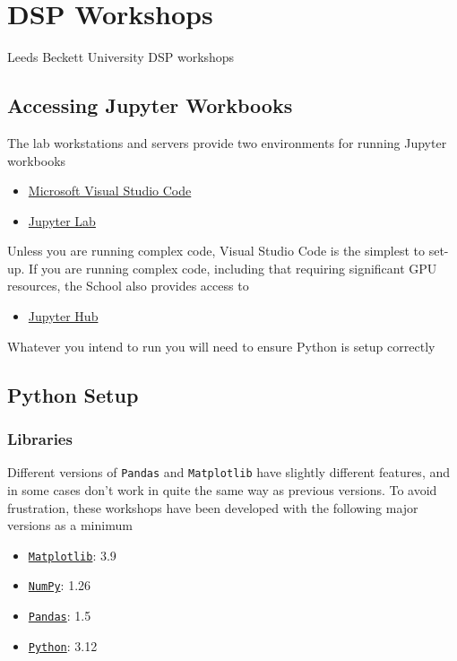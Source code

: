 \chapter{DSP Workshops}

Leeds Beckett University DSP workshops

\section{Accessing Jupyter Workbooks}

The lab workstations and servers provide two environments for running
Jupyter workbooks

\begin{itemize}
	\tightlist
	\item
	      \href{https://code.visualstudio.com/docs/datascience/jupyter-notebooks}{Microsoft
		      Visual Studio Code}
	\item
	      \href{https://jupyter.org/}{Jupyter Lab}
\end{itemize}

Unless you are running complex code, Visual Studio Code is the simplest
to set-up. If you are running complex code, including that requiring
significant GPU resources, the School also provides access to

\begin{itemize}
	\tightlist
	\item
	      \href{https://jupyterhub.aet.leedsbeckett.ac.uk/}{Jupyter Hub}
\end{itemize}

Whatever you intend to run you will need to ensure Python is setup
correctly

\section{Python Setup}

\subsection{Libraries}

Different versions of \texttt{Pandas} and \texttt{Matplotlib} have
slightly different features, and in some cases don't work in quite the
same way as previous versions. To avoid frustration, these workshops
have been developed with the following major versions as a minimum

\begin{itemize}
	\tightlist
	\item
	      \href{https://matplotlib.org/}{\texttt{Matplotlib}}: 3.9
	\item
	      \href{https://numpy.org/}{\texttt{NumPy}}: 1.26
	\item
	      \href{https://pandas.pydata.org/}{\texttt{Pandas}}: 1.5
	\item
	      \href{https://www.python.org/downloads/}{\texttt{Python}}: 3.12
\end{itemize}

